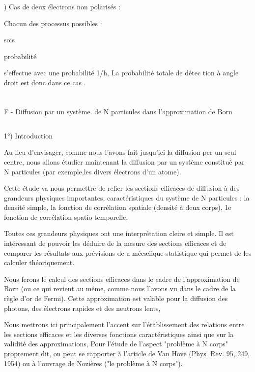 ) Cas de deux électrons non polarisés :

Chacun des processus possibles :

sois

probabilité

s'effectue avec une probabilité 1/h, La probabilité totale de détec
tion à angle droit est donc dans ce cas .

 

\section{}%
F - Diffusion par un système. de N particules dans l'approximation de Born

\subsection{}%
1°) Introduction

Au lieu d'envisager, comme nous l'avons fait jusqu'ici la diffusion per un seul
centre, nous allons étudier maintenant la diffusion par
un système constitué par N particules (par exemple,les divers électrons d'un
atome).

Cette étude va nous permettre de relier les sections efficaces
de diffusion à des grandeurs physiques importantes, caractéristiques du système de
N particules : la densité simple, la fonction de corrélation spatiale
(densité à deux corps), 1e fonction de corrélation spatio temporelle,

Toutes ces grandeurs physiques ont une interprétation cleire et
simple. Il est intéressant de pouvoir les déduire de la mesure des sections
efficaces et de comparer les résultats aux prévisions de a mécæiique statistique
qui permet de les calculer théoriquement.

Nous ferons le calcul des sections efficaces dans le cadre de
l'approximation de Born (ou ce qui revient au même, comme nous l'avons vu dans
le cadre de la règle d'or de Fermi). Cette approximation est valable pour la
diffusion des photons, des électrons rapides et des neutrons lents,

Nous mettrons ici principalement l'accent sur l'établissement
des relations entre les sections efficaces et les diverses fonctions
caractéristiques ainsi que sur la validité des approximations, Pour
l'étude de l'aspect "problème à N corps" proprement dit, on peut se rapporter à l'article de
Van Hove (Phys. Rev. 95, 249, 1954) ou à l'ouvrage de Nozières ("le problème
à N corps").


